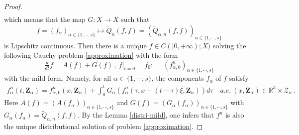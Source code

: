 \documentclass[reqno,11pt]{amsart}
\numberwithin{equation}{section}
\def\R{\mathbb{R}}
\begin{document}
\begin{proof}
\begin{equation*}
\begin{aligned}
		\end{aligned}
	\end{equation*}
which means that the map $G: X \to X$ such that 
$$f = (f_\alpha)_{\alpha \in \{ 1, \cdots, s \}} \mapsto \tilde{Q}_n (f,f) = ( \tilde{Q}_{\alpha, n} (f,f) )_{\alpha \in \{ 1, \cdots, s \}}$$
is Lipschitz continuous. Then there is a unique $f \in C ( [0, + \infty ) ; X )$ solving the following Cauchy problem \eqref{approximation} with the form
	\begin{equation}\label{G}
			\tfrac{d}{dt} f =A ( f ) + G ( f ) \,, \ f |_{t=0} = f_0 : = ( f^n_{\alpha ,0})_{\alpha \in \{ 1, \cdots, s \}}  
	\end{equation}
with the mild form. Namely, for all $\alpha \in \{ 1, \cdots, s \}$, the components $f_\alpha$ of $f$ satisfy
	\begin{equation*}
		\begin{aligned}
			f^n_\alpha (t, \mathbf{Z}_\alpha) = f^n_{\alpha ,0} (x,\mathbf{Z}_\alpha ) + \int_{0}^{t} G_\alpha ( f^n_\alpha (\tau,x-(t-\tau)\xi ,\mathbf{Z}_\alpha)) d \tau \quad a.e.\ (x,\mathbf{Z}_\alpha) \in \R^3\times \mathcal{Z}_\alpha \,.
		\end{aligned}
	\end{equation*}
Here $A (f) = ( A (f_\alpha) )_{\alpha \in \{ 1, \cdots, s \}}$ and $G (f) = ( G_\alpha (f_\alpha) )_{\alpha \in \{ 1, \cdots, s \}}$ with $G_\alpha (f_\alpha) = \tilde{Q}_{\alpha, n} (f,f)$. By the Lemma \ref{distri-mild}, one infers that $f^n$ is also the unique distributional solution of problem \eqref{approximation}. 


\end{proof}
\end{document}
